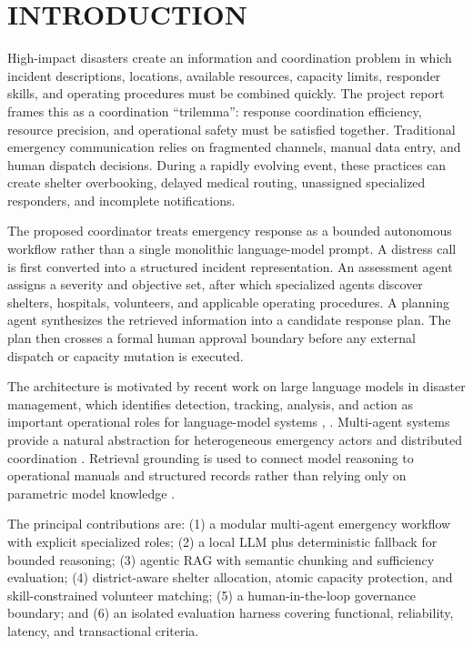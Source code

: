 \documentclass[conference]{IEEEtran}
\begin{document}
\section{INTRODUCTION}
High-impact disasters create an information and coordination problem in which incident descriptions, locations, available resources, capacity limits, responder skills, and operating procedures must be combined quickly. The project report frames this as a coordination ``trilemma'': response coordination efficiency, resource precision, and operational safety must be satisfied together. Traditional emergency communication relies on fragmented channels, manual data entry, and human dispatch decisions. During a rapidly evolving event, these practices can create shelter overbooking, delayed medical routing, unassigned specialized responders, and incomplete notifications.

The proposed coordinator treats emergency response as a bounded autonomous workflow rather than a single monolithic language-model prompt. A distress call is first converted into a structured incident representation. An assessment agent assigns a severity and objective set, after which specialized agents discover shelters, hospitals, volunteers, and applicable operating procedures. A planning agent synthesizes the retrieved information into a candidate response plan. The plan then crosses a formal human approval boundary before any external dispatch or capacity mutation is executed.

The architecture is motivated by recent work on large language models in disaster management, which identifies detection, tracking, analysis, and action as important operational roles for language-model systems \cite{b1}, \cite{b2}. Multi-agent systems provide a natural abstraction for heterogeneous emergency actors and distributed coordination \cite{b3}. Retrieval grounding is used to connect model reasoning to operational manuals and structured records rather than relying only on parametric model knowledge \cite{b4}.

The principal contributions are: (1) a modular multi-agent emergency workflow with explicit specialized roles; (2) a local LLM plus deterministic fallback for bounded reasoning; (3) agentic RAG with semantic chunking and sufficiency evaluation; (4) district-aware shelter allocation, atomic capacity protection, and skill-constrained volunteer matching; (5) a human-in-the-loop governance boundary; and (6) an isolated evaluation harness covering functional, reliability, latency, and transactional criteria.
\end{document}
